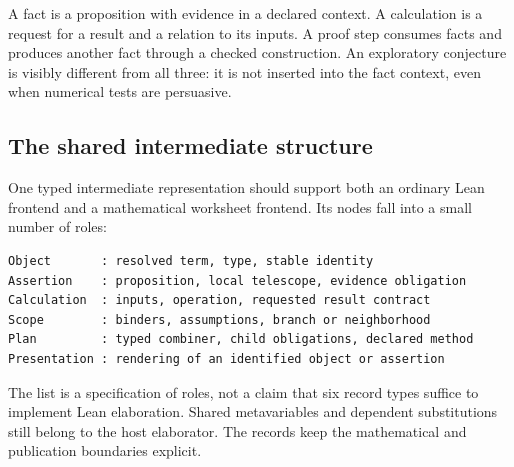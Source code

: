 \documentclass[11pt,a4paper]{article}
\theoremstyle{definition}
\begin{document}
A fact is a proposition with evidence in a declared context. A calculation is
a request for a result and a relation to its inputs. A proof step consumes facts
and produces another fact through a checked construction. An exploratory
conjecture is visibly different from all three: it is not inserted into the fact
context, even when numerical tests are persuasive.

\subsection{The shared intermediate structure}
One typed intermediate representation should support both an ordinary Lean
frontend and a mathematical worksheet frontend. Its nodes fall into a small
number of roles:
\par\noindent\begin{minipage}{\linewidth}
\begin{lstlisting}
Object       : resolved term, type, stable identity
Assertion    : proposition, local telescope, evidence obligation
Calculation  : inputs, operation, requested result contract
Scope        : binders, assumptions, branch or neighborhood
Plan         : typed combiner, child obligations, declared method
Presentation : rendering of an identified object or assertion
\end{lstlisting}
\end{minipage}\par
The list is a specification of roles, not a claim that six record types suffice
to implement Lean elaboration. Shared metavariables and dependent substitutions
still belong to the host elaborator. The records keep the mathematical and
publication boundaries explicit.

\begin{center}
\end{center}
\end{document}
